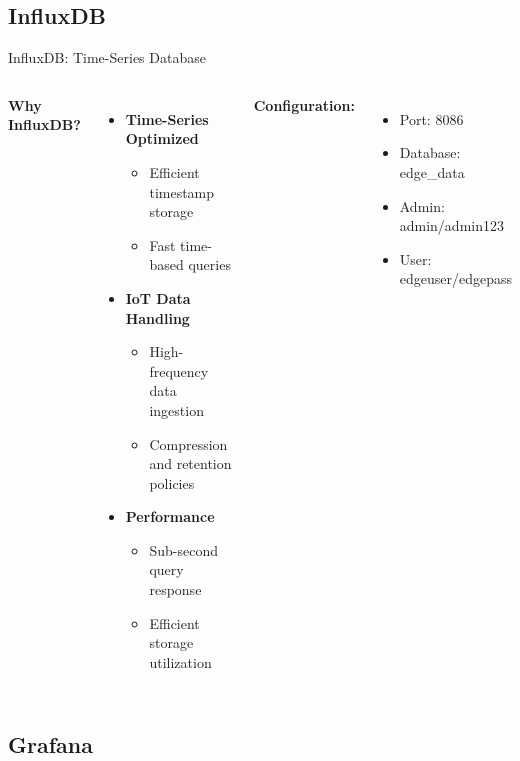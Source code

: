 \documentclass[aspectratio=169]{beamer}
\begin{document}
\subsection{InfluxDB}

\begin{frame}{InfluxDB: Time-Series Database}
\begin{columns}
\textbf{Why InfluxDB?}
\begin{itemize}
    \item \textbf{Time-Series Optimized}
    \begin{itemize}
        \item Efficient timestamp storage
        \item Fast time-based queries
    \end{itemize}
    \item \textbf{IoT Data Handling}
    \begin{itemize}
        \item High-frequency data ingestion
        \item Compression and retention policies
    \end{itemize}
    \item \textbf{Performance}
    \begin{itemize}
        \item Sub-second query response
        \item Efficient storage utilization
    \end{itemize}
\end{itemize}

\textbf{Configuration:}
\begin{itemize}
    \item Port: 8086
    \item Database: edge\_data
    \item Admin: admin/admin123
    \item User: edgeuser/edgepass
\end{itemize}
\end{columns}
\end{frame}

\subsection{Grafana}
\end{document}
